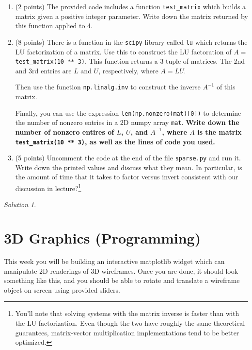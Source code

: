 \documentclass{article}
\theoremstyle{remark}
\newtheorem*{solution}{Solution}
\begin{document}
\begin{enumerate}
\item (2 points) The provided code includes a function \texttt{test\_matrix} which builds a matrix given a positive integer parameter. Write down the matrix returned by this function applied to 4.

\item (8 points) There is a function in the \texttt{scipy} library called \texttt{lu} which returns the LU factorization of a matrix.
  Use this to construct the LU factoration of $A = $ \texttt{test\_matrix(10 ** 3)}.
  This function returns a 3-tuple of matrices.
  The 2nd and 3rd entries are $L$ and $U$, respectively, where $A = LU$.

  Then use the function \texttt{np.linalg.inv} to construct the inverse $A^{-1}$ of this matrix.

  Finally, you can use the expression \texttt{len(np.nonzero(mat)[0])} to determine the number of nonzero entries in a 2D numpy array \texttt{mat}.
  \textbf{Write down the number of nonzero entires of $L$, $U$, and $A^{-1}$, where $A$ is the matrix \texttt{test\_matrix(10 ** 3)}, as well as the lines of code you used.}
\item (5 points)
  Uncomment the code at the end of the file \texttt{sparse.py} and run it.
  Write down the printed values and discuss what they mean.
  In particular, is the amount of time that it takes to factor versus invert consistent with our discussion in lecture?\footnote{You'll note that solving systems with the matrix inverse is faster than with the LU factorization. Even though the two have roughly the same theoretical guarantees, matrix-vector multiplication implementations tend to be better optimized.}
\end{enumerate}

\pagebreak

\begin{solution}
\end{solution}

\vfill

\pagebreak
\section{3D Graphics (Programming)}

\medskip

This week you will be building an interactive matplotlib widget which can manipulate 2D renderings of 3D wireframes.
Once you are done, it should look something like this, and you should be able to rotate and translate a wireframe object on screen using provided sliders.
\end{document}
